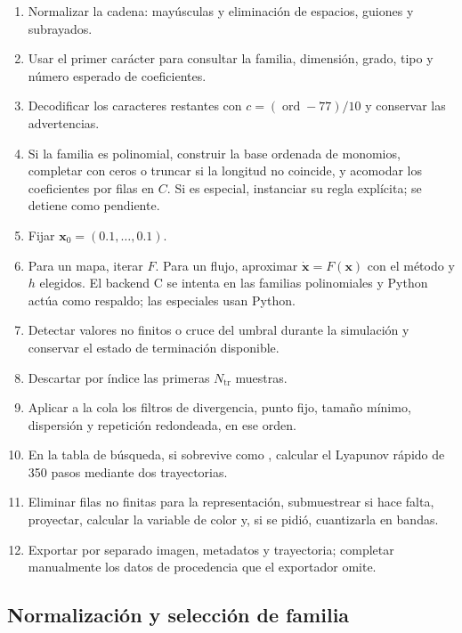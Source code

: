 \begin{enumerate}[label=\arabic*.]
 \item Normalizar la cadena: mayúsculas y eliminación de espacios, guiones y
       subrayados.
 \item Usar el primer carácter para consultar la familia, dimensión, grado, tipo
       y número esperado de coeficientes.
 \item Decodificar los caracteres restantes con \(c=(\operatorname{ord}-77)/10\)
       y conservar las advertencias.
 \item Si la familia es polinomial, construir la base ordenada de monomios,
       completar con ceros o truncar si la longitud no coincide, y acomodar los
       coeficientes por filas en \(C\). Si es especial, instanciar su regla
       explícita;  se detiene como pendiente.
 \item Fijar \(\mathbf{x}_0=(0.1,\ldots,0.1)\).
 \item Para un mapa, iterar \(F\). Para un flujo, aproximar
       \(\dot{\mathbf{x}}=F(\mathbf{x})\) con el método y \(h\) elegidos. El
       backend C se intenta en las familias polinomiales y Python actúa como
       respaldo; las especiales usan Python.
 \item Detectar valores no finitos o cruce del umbral durante la simulación y
       conservar el estado de terminación disponible.
 \item Descartar por índice las primeras \(N_{\mathrm{tr}}\) muestras.
 \item Aplicar a la cola los filtros de divergencia, punto fijo, tamaño mínimo,
       dispersión y repetición redondeada, en ese orden.
 \item En la tabla de búsqueda, si sobrevive como
       , calcular el Lyapunov rápido de 350 pasos
       mediante dos trayectorias.
 \item Eliminar filas no finitas para la representación, submuestrear si hace
       falta, proyectar, calcular la variable de color y, si se pidió, cuantizarla
       en bandas.
 \item Exportar por separado imagen, metadatos y trayectoria; completar
       manualmente los datos de procedencia que el exportador omite.
\end{enumerate}

\subsection{Normalización y selección de familia}

